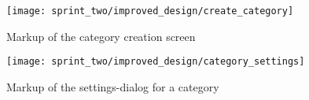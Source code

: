 \begin{figure}[!htbp]
    \centering
    \texttt{[image: sprint\_two/improved\_design/create\_category]}
    \caption{Markup of the category creation screen}
    \label{fig:improved_design_create_category}
\end{figure}

\begin{figure}[!htbp]
    \centering
    \texttt{[image: sprint\_two/improved\_design/category\_settings]}
    \caption{Markup of the settings-dialog for a category}
    \label{fig:improved_design_category_settings}
\end{figure}

\FloatBarrier